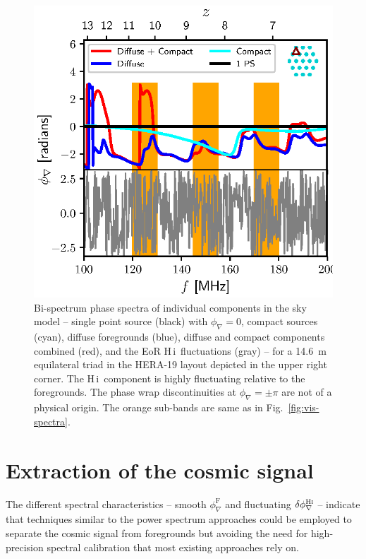 \documentclass[
reprint,
superscriptaddress,
amsmath,
amssymb,
aps,
prd
]{revtex4-1}
\newcommand{\HI}{H\,{\sc i}}
\begin{document}
\begin{figure}[htb]
\includegraphics[width=0.85\linewidth]{closure_phase_spectra_0_1_8}
\caption{Bi-spectrum phase spectra of individual components in the sky model -- single point source (black) with $\phi_\nabla=0$, compact sources (cyan), diffuse foregrounds (blue), diffuse and compact components combined (red), and the EoR \HI\ fluctuations (gray) -- for a 14.6~m equilateral triad in the HERA-19 layout depicted in the upper right corner. The \HI\ component is highly fluctuating relative to the foregrounds. The phase wrap discontinuities at $\phi_\nabla=\pm \pi$ are not of a physical origin. The orange sub-bands are same as in Fig.~\ref{fig:vis-spectra}. \label{fig:cp-spectra}}
\end{figure}

\section{Extraction of the cosmic signal}\label{sec:extraction}

The different spectral characteristics -- smooth $\phi_\nabla^\textrm{F}$ and fluctuating $\delta\phi_\nabla^\textrm{H{\sc i}}$ -- indicate that techniques similar to the power spectrum approaches could be employed to separate the cosmic signal from foregrounds but avoiding the need for high-precision spectral calibration that most existing approaches rely on.
\end{document}
